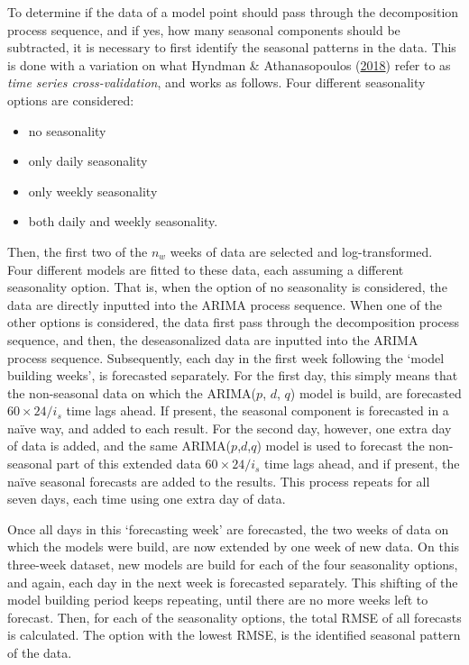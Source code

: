 \documentclass[12pt,oneside]{reedthesis}
\providecommand{\tightlist}{%
  \setlength{\itemsep}{0pt}\setlength{\parskip}{0pt}}
\begin{document}
To determine if the data of a model point should pass through the
decomposition process sequence, and if yes, how many seasonal components
should be subtracted, it is necessary to first identify the seasonal
patterns in the data. This is done with a variation on what Hyndman \&
Athanasopoulos (\protect\hyperlink{ref-hyndman2018fpp}{2018}) refer to
as \emph{time series cross-validation}, and works as follows. Four
different seasonality options are considered:
\begin{itemize}
\tightlist
\item
  no seasonality
\item
  only daily seasonality
\item
  only weekly seasonality
\item
  both daily and weekly seasonality.
\end{itemize}
Then, the first two of the \(n_{w}\) weeks of data are selected and
log-transformed. Four different models are fitted to these data, each
assuming a different seasonality option. That is, when the option of no
seasonality is considered, the data are directly inputted into the ARIMA
process sequence. When one of the other options is considered, the data
first pass through the decomposition process sequence, and then, the
deseasonalized data are inputted into the ARIMA process sequence.
Subsequently, each day in the first week following the `model building
weeks', is forecasted separately. For the first day, this simply means
that the non-seasonal data on which the ARIMA(\(p\), \(d\), \(q\)) model
is build, are forecasted \(60 \times 24 / i_{s}\) time lags ahead. If
present, the seasonal component is forecasted in a naïve way, and added
to each result. For the second day, however, one extra day of data is
added, and the same ARIMA(\(p\),\(d\),\(q\)) model is used to forecast
the non-seasonal part of this extended data \(60 \times 24 / i_{s}\)
time lags ahead, and if present, the naïve seasonal forecasts are added
to the results. This process repeats for all seven days, each time using
one extra day of data.

Once all days in this `forecasting week' are forecasted, the two weeks
of data on which the models were build, are now extended by one week of
new data. On this three-week dataset, new models are build for each of
the four seasonality options, and again, each day in the next week is
forecasted separately. This shifting of the model building period keeps
repeating, until there are no more weeks left to forecast. Then, for
each of the seasonality options, the total RMSE of all forecasts is
calculated. The option with the lowest RMSE, is the identified seasonal
pattern of the data.
\end{document}
